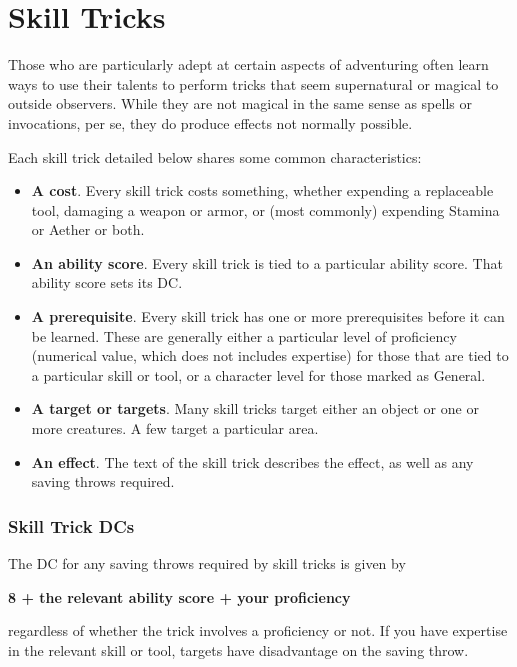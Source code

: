 \chapter{Skill Tricks}
\label{ch:skill-tricks}

Those who are particularly adept at certain aspects of adventuring often learn ways to use their talents to perform tricks that seem supernatural or magical to outside observers. While they are not magical in the same sense as spells or invocations, per se, they do produce effects not normally possible.

Each skill trick detailed below shares some common characteristics:
\begin{itemize}
	\item \textbf{A cost}. Every skill trick costs something, whether expending a replaceable tool, damaging a weapon or armor, or (most commonly) expending Stamina or Aether or both.
	\item \textbf{An ability score}. Every skill trick is tied to a particular ability score. That ability score sets its DC.
	\item \textbf{A prerequisite}. Every skill trick has one or more prerequisites before it can be learned. These are generally either a particular level of proficiency (numerical value, which does not includes expertise) for those that are tied to a particular skill or tool, or a character level for those marked as General.
	\item \textbf{A target or targets}. Many skill tricks target either an object or one or more creatures. A few target a particular area.
	\item \textbf{An effect}. The text of the skill trick describes the effect, as well as any saving throws required.
\end{itemize}

\subsection{Skill Trick DCs}
The DC for any saving throws required by skill tricks is given by

\begin{center}
\textbf{8 + the relevant ability score + your proficiency}
\end{center}

regardless of whether the trick involves a proficiency or not. If you have expertise in the relevant skill or tool, targets have disadvantage on the saving throw.

